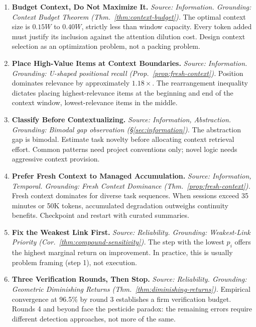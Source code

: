 \documentclass[11pt, a4paper]{googledeepmind}
\begin{document}
\begin{enumerate}[label=\textbf{P\arabic*.}, leftmargin=3em]

\item \textbf{Budget Context, Do Not Maximize It.}
\emph{Source: Information. Grounding: Context Budget Theorem (Thm.~\ref{thm:context-budget}).}
The optimal context size is $0.15W$ to $0.40W$, strictly less than window capacity. Every token added must justify its inclusion against the attention dilution cost. Design context selection as an optimization problem, not a packing problem.

\item \textbf{Place High-Value Items at Context Boundaries.}
\emph{Source: Information. Grounding: U-shaped positional recall (Prop.~\ref{prop:fresh-context}).}
Position dominates relevance by approximately $1.18\times$. The rearrangement inequality dictates placing highest-relevance items at the beginning and end of the context window, lowest-relevance items in the middle.

\item \textbf{Classify Before Contextualizing.}
\emph{Source: Information, Abstraction. Grounding: Bimodal gap observation (\S\ref{sec:information}).}
The abstraction gap is bimodal. Estimate task novelty before allocating context retrieval effort. Common patterns need project conventions only; novel logic needs aggressive context provision.

\item \textbf{Prefer Fresh Context to Managed Accumulation.}
\emph{Source: Information, Temporal. Grounding: Fresh Context Dominance (Thm.~\ref{prop:fresh-context}).}
Fresh context dominates for diverse task sequences. When sessions exceed 35 minutes or 50K tokens, accumulated degradation outweighs continuity benefits. Checkpoint and restart with curated summaries.

\item \textbf{Fix the Weakest Link First.}
\emph{Source: Reliability. Grounding: Weakest-Link Priority (Cor.~\ref{thm:compound-sensitivity}).}
The step with the lowest $p_i$ offers the highest marginal return on improvement. In practice, this is usually problem framing (step 1), not execution.

\item \textbf{Three Verification Rounds, Then Stop.}
\emph{Source: Reliability. Grounding: Geometric Diminishing Returns (Thm.~\ref{thm:diminishing-returns}).}
Empirical convergence at 96.5\% by round 3 establishes a firm verification budget. Rounds 4 and beyond face the pesticide paradox: the remaining errors require different detection approaches, not more of the same.


\end{enumerate}
\end{document}
